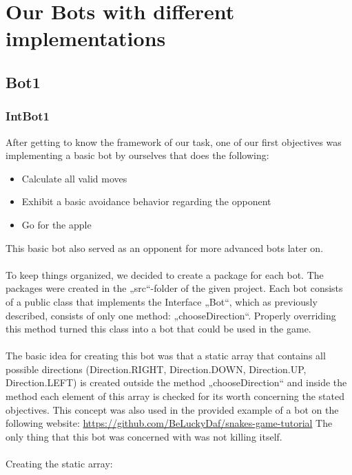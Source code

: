 \documentclass[a4paper,12pt]{article}
\begin{document}
\section{Our Bots with different implementations}
\subsection{Bot1}
\subsubsection{IntBot1}
After getting to know the framework of our task, one of our first objectives was implementing a
basic bot by ourselves that does the following:\\
\begin{itemize}
\item Calculate all valid moves
\item Exhibit a basic avoidance behavior regarding the opponent
\item Go for the apple
\end{itemize}
This basic bot also served as an opponent for more advanced bots later on.\\
\\
To keep things organized, we decided to create a package for each bot. The packages were created
in the „src“-folder of the given project. Each bot consists of a public class that implements the
Interface „Bot“, which as previously described, consists of only one method: „chooseDirection“.
Properly overriding this method turned this class into a bot that could be used in the game.
\\
\\
The basic idea for creating this bot was that a static array that contains all possible directions
(Direction.RIGHT, Direction.DOWN, Direction.UP, Direction.LEFT) is created outside the method
„chooseDirection“ and inside the method each element of this array is checked for its worth
concerning the stated objectives. This concept was also used in the provided example of  a bot  on the following website: \url{https://github.com/BeLuckyDaf/snakes-game-tutorial} The only thing that this bot was concerned with was not killing itself.\\
\\
Creating the static array:
\end{document}
